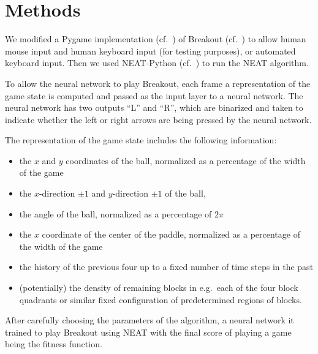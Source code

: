 \documentclass[letterpaper, twocolumn, conference]{article}
\begin{document}
\section{Methods}
We modified a Pygame implementation (cf.~\cite{pygame}) of Breakout (cf.~\cite{max00355breakout}) to allow
human mouse input and human keyboard input (for testing purposes), or automated keyboard input.
Then we used NEAT-Python (cf.~\cite{neatpython}) to run the NEAT algorithm.

To allow the neural network to play Breakout,
each frame a representation of the game state is computed and
passed as the input layer to a neural network.
The neural network has two outputs ``L'' and ``R'', which are binarized
and taken to indicate whether the left or right arrows are being pressed by the neural network.

The representation of the game state includes the following information:
\begin{itemize}
    \item{} the $x$ and $y$ coordinates of the ball, normalized as a percentage of the width of the game
    \item{} the $x$-direction $\pm1$ and $y$-direction $\pm 1$ of the ball,
    \item{} the angle of the ball, normalized as a percentage of $2\pi$
    \item{} the $x$ coordinate of the center of the paddle, normalized as a percentage of the width of the game
    \item{} the history of the previous four up to a fixed number of time steps in the past
    \item{} (potentially) the density of remaining blocks in e.g.\ each of the four block quadrants or similar fixed configuration of predetermined regions of blocks.
\end{itemize}

After carefully choosing the parameters of the algorithm, a neural network
it trained to play Breakout using NEAT with the final score of playing a game being the fitness function.
\end{document}
